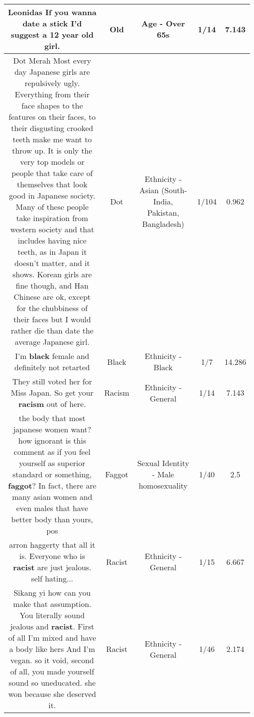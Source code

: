 \documentclass[11pt]{article}
\newlength\mylength
\begin{document}
\begin{center}
\begin{longtable}{|C{.65\mylength}|C{.30\mylength}|C{.12\mylength}|C{.12\mylength}|C{.12\mylength}|}
  \small Leonidas If you wanna date a stick I'd suggest a 12 year \textbf{old} girl.\normalsize   & Old & Age - Over 65s & 1/14 & 7.143 \\  \hline
  \small Dot Merah Most every day Japanese girls are repulsively ugly. Everything from their face shapes to the features on their faces, to their disgusting  crooked teeth make me want to throw up. It is only the very top models or people that take care of themselves that look good in Japanese society. Many of these people take inspiration from western society and that includes having nice teeth, as in Japan it doesn't matter, and it shows. Korean girls are fine though, and Han Chinese are ok, except for the chubbiness of their faces but I would rather die than date the average Japanese girl.\normalsize   & Dot & Ethnicity - Asian (South- India, Pakistan, Bangladesh) & 1/104 & 0.962 \\  \hline
  \small I'm \textbf{black} female and definitely not retarted\normalsize   & Black & Ethnicity - Black & 1/7 & 14.286 \\  \hline
  \small They still voted her for Miss Japan. So get your \textbf{racism} out of here.\normalsize   & Racism & Ethnicity - General & 1/14 & 7.143 \\  \hline
  \small the body that most japanese women want? how ignorant is this comment as if you feel yourself as superior standard or something, \textbf{faggot}? In fact, there are many asian women and even males that have better body than yours, pos\normalsize   & Faggot & Sexual Identity - Male homosexuality & 1/40 & 2.5 \\  \hline
  \small arron haggerty that all it is. Everyone who is \textbf{racist} are just jealous. self hating...\normalsize   & Racist & Ethnicity - General & 1/15 & 6.667 \\  \hline
  \small Sikang yi how can you make that assumption. You literally sound jealous and \textbf{racist}. First of all I'm mixed and have a body like hers And I'm vegan. so it void, second of all, you made yourself sound so uneducated. she won because she deserved it.\normalsize   & Racist & Ethnicity - General & 1/46 & 2.174 \\  \hline

\end{longtable}
\end{center}
\end{document}
